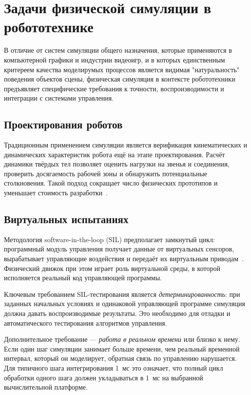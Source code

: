 \section{Задачи физической симуляции в робототехнике}

В отличие от систем симуляции общего назначения, которые применяются в компьютерной графики и индустрии 
видеоигр, и в которых единственным критереем качества моделирумых процессов является видимая "натуральность" 
поведения объектов сцены, физическая симуляция в контексте робототехники предъявляет специфические требования 
к точности, воспроизводимости и интеграции с системами управления.

\subsection{Проектирования роботов}

Традиционным применением симуляции является верификация кинематических и динамических характеристик робота ещё 
на этапе проектирования. Расчёт динамики твёрдых тел позволяет оценить нагрузки на звенья и соединения, 
проверить досягаемость рабочей зоны и обнаружить потенциальные столкновения. Такой подход сокращает число 
физических прототипов и уменьшает стоимость разработки~\cite{siciliano2016springer}.

\subsection{Виртуальных испытаниях}

Методология software-in-the-loop (SIL) предполагает замкнутый цикл: программный модуль управления получает 
данные от виртуальных сенсоров, вырабатывает управляющие воздействия и передаёт их виртуальным 
приводам~\cite{bruyninckx2001open}. Физический движок при этом играет роль виртуальной среды, в которой 
исполняется реальный код управляющей программы.

Ключевым требованием SIL-тестирования является \emph{детерминированность}: при заданных начальных условиях и 
одинаковой управляющей программе симуляция должна давать воспроизводимые результаты. Это необходимо для 
отладки и автоматического тестирования алгоритмов управления.

Дополнительное требование --- \emph{работа в реальном времени} или близко к нему. Если один шаг симуляции 
занимает больше времени, чем реальный временной интервал, который он моделирует, обратная связь по управлению 
нарушается. Для типичного шага интегрирования 1~мс это означает, что полный цикл обработки одного шага должен 
укладываться в 1~мс на выбранной вычислительной платформе.

